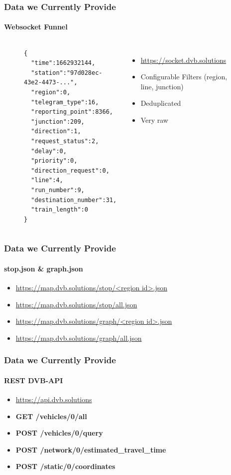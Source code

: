 
\begin{frame}[fragile]
\frametitle{Data we Currently Provide}
\framesubtitle{Websocket Funnel}
\begin{figure}
\begin{columns}
\begin{lstlisting}[basicstyle=\scriptsize]
{
  "time":1662932144,
  "station":"97d028ec-43e2-4473-...",
  "region":0,
  "telegram_type":16,
  "reporting_point":8366,
  "junction":209,
  "direction":1,
  "request_status":2,
  "delay":0,
  "priority":0,
  "direction_request":0,
  "line":4,
  "run_number":9,
  "destination_number":31,
  "train_length":0
}
\end{lstlisting}
\raggedright
\vspace{0.5cm}

\begin{itemize}
  \item \url{https://socket.dvb.solutions}
  \item Configurable Filters (region, line, junction)
  \item Deduplicated
  \item Very raw
\end{itemize}
\end{columns}
\end{figure}
\end{frame}


\begin{frame}[fragile]
\frametitle{Data we Currently Provide}
\framesubtitle{stop.json \& graph.json}

  \begin{itemize}
    \item \url{https://map.dvb.solutions/stop/<region id>.json}
    \item \url{https://map.dvb.solutions/stop/all.json}
    \item \url{https://map.dvb.solutions/graph/<region id>.json}
    \item \url{https://map.dvb.solutions/graph/all.json}
  \end{itemize}
\end{frame}

\begin{frame}[fragile]
\frametitle{Data we Currently Provide}
\framesubtitle{REST DVB-API}

\begin{itemize}
     \item \url{https://api.dvb.solutions}
     \item \textbf{GET  /vehicles/0/all}
     \item \textbf{POST /vehicles/0/query}
     \item \textbf{POST /network/0/estimated\_travel\_time}
     \item \textbf{POST /static/0/coordinates}
  \end{itemize}
\end{frame}

